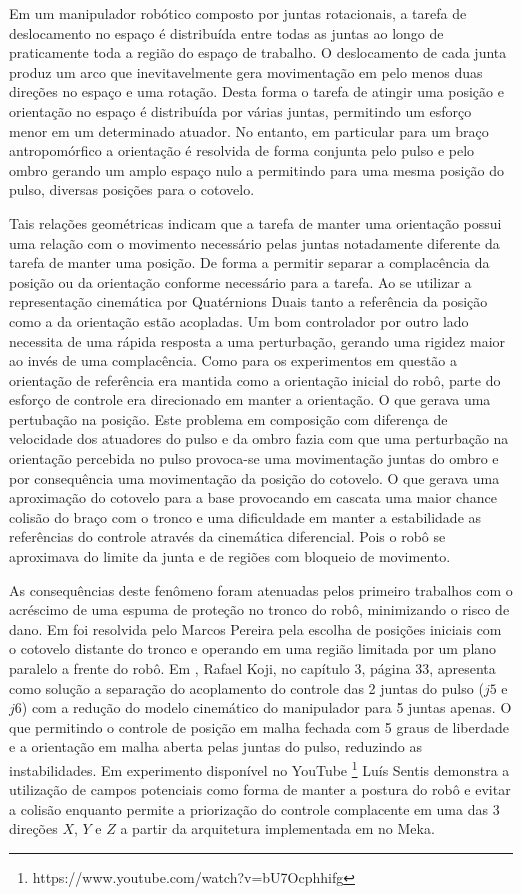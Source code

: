 Em um manipulador robótico composto por juntas rotacionais, a tarefa de deslocamento no espaço é distribuída entre todas as juntas ao longo de praticamente toda a região do espaço de trabalho. O deslocamento de cada junta produz um arco que inevitavelmente gera movimentação em pelo menos duas direções no espaço e uma rotação. Desta forma o tarefa de atingir uma posição e orientação no espaço é distribuída por várias juntas, permitindo um esforço menor em um determinado atuador. No entanto, em particular para um braço antropomórfico a orientação é resolvida de forma conjunta pelo pulso e pelo ombro gerando um amplo espaço nulo a permitindo para uma mesma posição do pulso, diversas posições para o cotovelo.

Tais relações geométricas indicam que a tarefa de manter uma orientação possui uma relação com o movimento necessário pelas juntas notadamente diferente da tarefa de manter uma posição. De forma a permitir separar a complacência da posição ou da orientação conforme necessário para a tarefa. Ao se utilizar a representação cinemática por Quatérnions Duais tanto a referência da posição como a da orientação estão acopladas. Um bom controlador por outro lado necessita de uma rápida resposta a uma perturbação, gerando uma rigidez maior ao invés de uma complacência. Como para os experimentos em questão a orientação de referência era mantida como a orientação inicial do robô, parte do esforço de controle era direcionado em manter a orientação. O que gerava uma pertubação na posição. Este problema em composição com diferença de velocidade dos atuadores do pulso e da ombro fazia com que uma perturbação na orientação percebida no pulso provoca-se uma movimentação juntas do ombro e por consequência uma movimentação da posição do cotovelo. O que gerava uma aproximação do cotovelo para a base provocando em cascata uma maior chance colisão do braço com o tronco e uma dificuldade em manter a estabilidade as referências do controle através da cinemática diferencial. Pois o robô se aproximava do limite da junta e de regiões com bloqueio de movimento.

As consequências deste fenômeno foram atenuadas pelos primeiro trabalhos com o acréscimo de uma espuma de proteção no tronco do robô, minimizando o risco de dano. Em \cite{nobody} foi resolvida pelo Marcos Pereira pela escolha de posições iniciais com o cotovelo distante do tronco e operando em uma região limitada por um plano paralelo a frente do robô. Em \cite{nobody}, Rafael Koji, no capítulo 3, página 33, apresenta como solução a separação do acoplamento do controle das 2 juntas do pulso ($j5$ e $j6$) com a redução do modelo cinemático do manipulador para 5 juntas apenas. O que permitindo o controle de posição em malha fechada com 5 graus de liberdade e a orientação em malha aberta pelas juntas do pulso, reduzindo as instabilidades. Em experimento disponível no YouTube \footnote{https://www.youtube.com/watch?v=bU7Ocphhifg} Luís Sentis demonstra a utilização de campos potenciais como forma de manter a postura do robô e evitar a colisão enquanto permite a priorização do controle complacente em uma das 3 direções $X$, $Y$ e $Z$ a partir da arquitetura implementada em \cite{sentis2007synthesis} no Meka.

